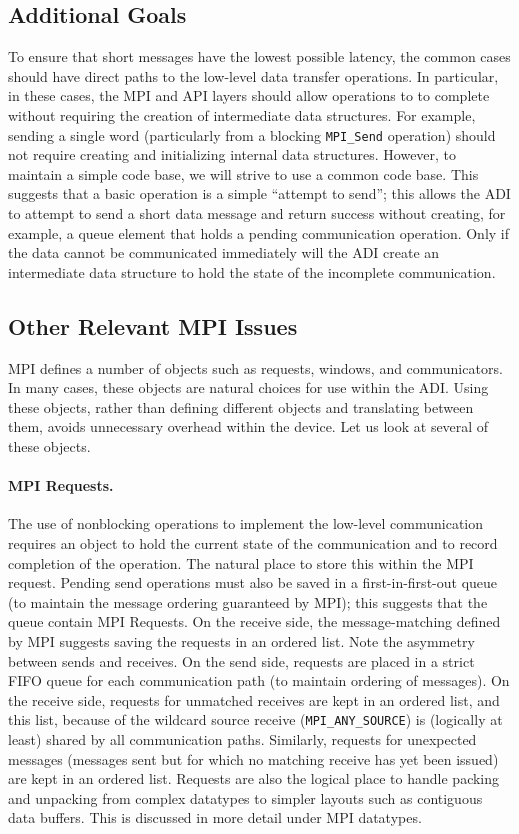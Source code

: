 \documentclass{article}
\def\code#1{\texttt{#1}}
\begin{document}
\subsection{Additional Goals}
To ensure that short messages have the lowest possible latency, the
common cases should have direct paths to the low-level data transfer
operations.  In particular, in these cases, the MPI and API layers
should allow operations to to complete without requiring the creation
of intermediate data structures.  For example, sending a single word
(particularly from a blocking \code{MPI_Send} operation) should not
require creating and initializing internal data structures.  However,
to maintain a simple code base, we will strive to use a common code
base.  This suggests that a basic operation is a simple ``attempt to
send''; this allows the ADI to attempt to send a short data message
and return success without creating, for example, a queue element that
holds a pending communication operation.  Only if the data cannot be
communicated immediately will the ADI create an intermediate data
structure to hold the state of the incomplete communication.  

\subsection{Other Relevant MPI Issues}
MPI defines a number of objects such as requests, windows, and
communicators.  In many cases, these objects are natural choices for
use within the ADI.  Using these objects, rather than defining
different objects and translating between them, avoids unnecessary
overhead within the device.  Let us look at several of these objects.

\paragraph{MPI Requests.}
The use of nonblocking operations to implement the low-level
communication requires an object to hold the current state of the
communication and to record completion of the operation.  The natural
place to store this within the MPI request.  Pending send operations must
also be saved in a first-in-first-out queue (to maintain the message
ordering guaranteed by MPI); this suggests that the queue contain MPI
Requests.  On the receive side, the message-matching defined by MPI
suggests saving the requests in an ordered list.  Note the asymmetry
between sends and receives.  On the send side, requests are placed in
a strict FIFO queue for each communication path (to maintain ordering
of messages).  On the receive side, requests for unmatched receives
are kept in an ordered 
list, and this list, because of the wildcard source receive
(\code{MPI_ANY_SOURCE}) is (logically at least) shared by all
communication paths.  Similarly, requests for unexpected messages
(messages sent but for which no matching receive has yet been issued)
are kept in an ordered list.
Requests are also the logical place to handle packing and
unpacking from complex datatypes to simpler layouts such as contiguous
data buffers.  This is discussed in more detail under MPI datatypes.
\end{document}
